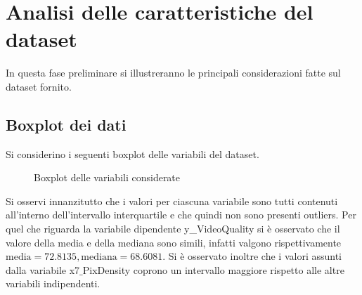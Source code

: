 \section{Analisi delle caratteristiche del dataset}
In questa fase preliminare si illustreranno le principali considerazioni fatte sul dataset fornito.
\subsection{Boxplot dei dati}
Si considerino i seguenti boxplot delle variabili del dataset.
\begin{figure}[h]
	\centering
	\caption{Boxplot delle variabili considerate}
\end{figure}

Si osservi innanzitutto che i valori per ciascuna variabile sono tutti contenuti all'interno dell'intervallo interquartile e che quindi non sono presenti outliers. Per quel che riguarda la variabile dipendente y\_VideoQuality si è osservato che il valore della media e della mediana sono simili, infatti valgono rispettivamente  $\text{media}=72.8135, \text{mediana}=68.6081$. Si è osservato inoltre che i valori assunti dalla variabile x7$\_$PixDensity coprono un intervallo maggiore rispetto alle altre variabili indipendenti. 
